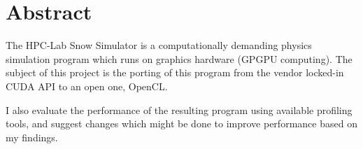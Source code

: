 \section*{Abstract}
The HPC-Lab Snow Simulator is a computationally demanding physics simulation program which runs on graphics hardware (GPGPU computing). The subject of this project is the porting of this program from the vendor locked-in CUDA API to an open one, OpenCL.

I also evaluate the performance of the resulting program using available profiling tools, and suggest changes which might be done to improve performance based on my findings.